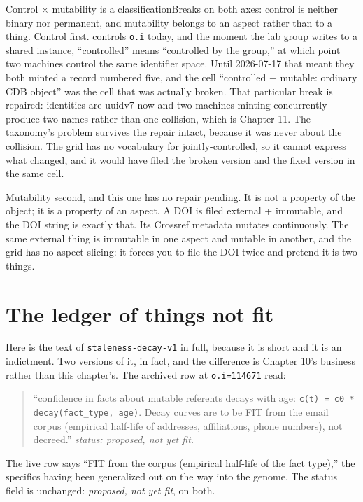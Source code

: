 \begin{Analogy}{Control $\times$ mutability is a classification}{Breaks on both axes: control is neither binary nor permanent, and mutability belongs to an aspect rather than to a thing.}
Control first. \labPI{} controls \texttt{o.i} today, and the moment the lab group writes to a shared instance, ``controlled'' means ``controlled by the group,'' at which point two machines control the same identifier space. Until 2026-07-17 that meant they both minted a record numbered five, and the cell ``controlled + mutable: ordinary CDB object'' was the cell that was actually broken. That particular break is repaired: identities are uuidv7 now and two machines minting concurrently produce two names rather than one collision, which is Chapter 11. The taxonomy's problem survives the repair intact, because it was never about the collision. The grid has no vocabulary for jointly-controlled, so it cannot express what changed, and it would have filed the broken version and the fixed version in the same cell.

Mutability second, and this one has no repair pending. It is not a property of the object; it is a property of an aspect. A DOI is filed external + immutable, and the DOI string is exactly that. Its Crossref metadata mutates continuously. The same external thing is immutable in one aspect and mutable in another, and the grid has no aspect-slicing: it forces you to file the DOI twice and pretend it is two things.
\end{Analogy}

\section{The ledger of things not fit}

Here is the text of \texttt{staleness-decay-v1} in full, because it is short and it is an indictment. Two versions of it, in fact, and the difference is Chapter 10's business rather than this chapter's. The archived row at \texttt{o.i=114671} read:

\begin{quote}
\small ``confidence in facts about mutable referents decays with age: \texttt{c(t) = c0 * decay(fact\_type, age)}. Decay curves are to be FIT from the email corpus (empirical half-life of addresses, affiliations, phone numbers), not decreed.'' \emph{status: proposed, not yet fit.}
\end{quote}

The live row says ``FIT from the corpus (empirical half-life of the fact type),'' the specifics having been generalized out on the way into the genome. The status field is unchanged: \emph{proposed, not yet fit}, on both.

